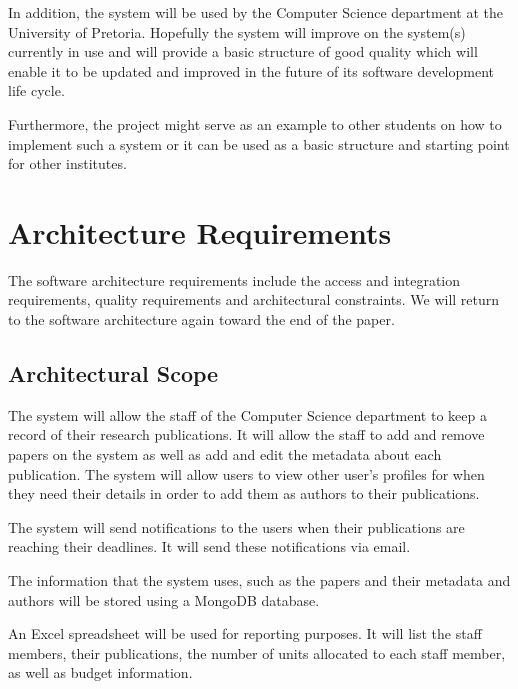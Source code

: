 \documentclass[a4paper,12pt]{article}
\begin{document}
In addition, the system will be used by the Computer Science department at the University of Pretoria. Hopefully the system will improve on the system(s) currently in use and will provide a basic structure of good quality which will enable it to be updated and improved in the future of its software development life cycle.
 	
Furthermore, the project might serve as an example to other students on how to implement such a system or it can be used as a basic structure and starting point for other institutes.

\newpage
\section{Architecture Requirements}

The software architecture requirements include the access and integration requirements, quality requirements and architectural constraints. We will return to the software architecture again toward the end of the paper.

\subsection{Architectural Scope}
The system will allow the staff of the Computer Science department to keep a record of their research publications.
It will allow the staff to add and remove papers on the system as well as add and edit the metadata about each publication.
The system will allow users to view other user's profiles for when they need their details in order to add them as authors to their publications.

The system will send notifications to the users when their publications are reaching their deadlines. It will send these notifications via email.

The information that the system uses, such as the papers and their metadata and authors will be stored using a MongoDB database.

An Excel spreadsheet will be used for reporting purposes. It will list the staff members, their publications, the number of units allocated to each staff member, as well as budget information.

\end{document}
